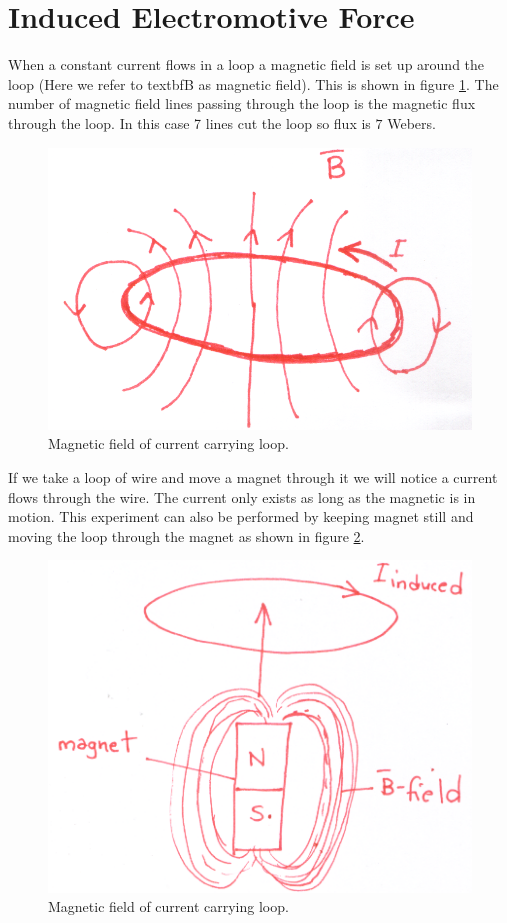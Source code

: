 \documentclass[12pt,a4paper]{article}
\begin{document}
\section{Induced Electromotive Force}
When a constant current flows in a loop a magnetic field is set up around the loop (Here we refer to 
textbf{B} as magnetic field). This is shown in figure \ref{B-field-loop}. The number of magnetic field lines passing through the loop is the magnetic flux through the loop. In this case 7 lines cut the loop so flux is $7$ Webers.
\begin{figure}[H]
\centering
\includegraphics[scale=0.5]{BFieldLoop.png}
\caption{Magnetic field of current carrying loop.}
\label{B-field-loop}
\end{figure}
If we take a loop of wire and move a magnet through it we will notice a current flows through the wire. The current only exists as long as the magnetic is in motion. This experiment can also be performed by keeping magnet still and moving the loop through the magnet as shown in figure \ref{Magnet-through-loop}. 
\begin{figure}[H]
\centering
\includegraphics[scale=0.5]{InducedCurrentMagnet.png}
\caption{Magnetic field of current carrying loop.}
\label{Magnet-through-loop}
\end{figure}
\end{document}
